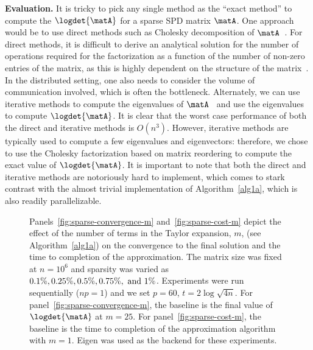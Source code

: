 \vspace{0.02in}\noindent \textbf{Evaluation.}
\noindent
It is tricky to pick any single method as the ``exact method'' to compute the
$\logdet{\matA}$ for a sparse SPD matrix $\matA$.
One approach would be to use direct methods such as Cholesky decomposition of
$\matA$~\cite{davis2006direct,gupta2000wsmp}.
For direct methods, it is difficult to derive an analytical solution
for the number of operations required for the factorization as a function of the
number of non-zero entries of the matrix, as this is highly dependent on the structure of
the matrix~\cite{gupta1997highly}.
In the distributed setting, one also needs to consider the volume of
communication involved, which is often the bottleneck.
Alternately, we can use iterative methods to compute the eigenvalues of
$\matA$~\cite{davidson1975iterative} and use the eigenvalues to compute
$\logdet{\matA}$.
It is clear that the worst case performance of both the direct and iterative
methods is $O(n^3)$.
However, iterative methods are typically used to compute a few eigenvalues and
eigenvectors: therefore, we chose to use the Cholesky factorization based on
matrix reordering to compute the exact value of $\logdet{\matA}$.
It is important to note that both the direct and iterative methods are
notoriously hard to implement, which comes to stark contrast with the almost trivial implementation of Algorithm~\ref{alg1a}, which is also readily parallelizable.
\begin{figure}[t]
\begin{center}
\end{center}
\caption{
Panels~\ref{fig:sparse-convergence-m} and~\ref{fig:sparse-cost-m} depict the
effect of the number of terms in the Taylor expansion, $m$, (see
Algorithm~\ref{alg1a}) on the convergence to the final solution and the time to
completion of the approximation.
The matrix size was fixed at $n=10^6$ and sparsity was varied as $0.1\%,
0.25\%, 0.5\%, 0.75\%, \textnormal{ and } 1\%$.
Experiments were run sequentially ($np=1$) and we set $p=60$, $t=2\log\sqrt{4n}$.
For panel~\ref{fig:sparse-convergence-m}, the baseline is the final value of
$\logdet{\matA}$ at $m=25$.
For panel~\ref{fig:sparse-cost-m}, the baseline is the time to completion of the approximation algorithm with $m=1$.
Eigen was used as the backend for these experiments.
}
\label{fig:sparse}
\end{figure}

